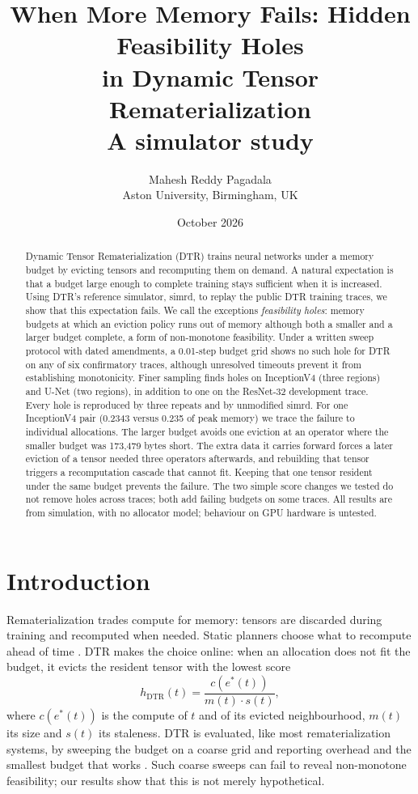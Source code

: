 \documentclass[11pt]{article}
\title{When More Memory Fails: Hidden Feasibility Holes\\in Dynamic Tensor Rematerialization\\[0.4em]
\large A simulator study}
\author{Mahesh Reddy Pagadala\\Aston University, Birmingham, UK}
\date{October 2026}
\begin{document}
\maketitle

\begin{abstract}
Dynamic Tensor Rematerialization (DTR) trains neural networks under a memory budget by
evicting tensors and recomputing them on demand. A natural expectation is that a budget
large enough to complete training stays sufficient when it is increased. Using DTR's
reference simulator, simrd, to replay the public DTR training traces, we show that this
expectation fails. We call the exceptions \emph{feasibility holes}: memory budgets at which
an eviction policy runs out of memory although both a smaller and a larger budget
complete, a form of non-monotone feasibility. Under a written sweep protocol with dated
amendments, a 0.01-step budget grid shows no such hole for DTR on any of six confirmatory
traces, although unresolved timeouts prevent it from establishing monotonicity. Finer sampling finds holes on InceptionV4 (three regions) and U-Net (two regions),
in addition to one on the ResNet-32 development trace. Every hole is reproduced by three
repeats and by unmodified simrd. For one InceptionV4 pair (0.2343 versus 0.235 of peak
memory) we trace the failure to individual allocations. The larger budget avoids one
eviction at an operator where the smaller budget was 173{,}479 bytes short. The extra data
it carries forward forces a later eviction of a tensor needed three operators afterwards,
and rebuilding that tensor triggers a recomputation cascade that cannot fit. Keeping that
one tensor resident under the same budget prevents the failure. The two simple score changes we
tested do not remove holes across traces; both add failing budgets on some traces. All results are from simulation,
with no allocator model; behaviour on GPU hardware is untested.
\end{abstract}

\section{Introduction}
Rematerialization trades compute for memory: tensors are discarded during training and
recomputed when needed. Static planners choose what to recompute ahead of time
\cite{chen2016,jain2020checkmate}. DTR \cite{kirisame2021dtr} makes the choice online: when
an allocation does not fit the budget, it evicts the resident tensor with the lowest score
\begin{equation}
h_{\mathrm{DTR}}(t) = \frac{c(e^*(t))}{m(t)\cdot s(t)},
\end{equation}
where $c(e^*(t))$ is the compute of $t$ and of its evicted neighbourhood, $m(t)$ its size
and $s(t)$ its staleness. DTR is evaluated, like most rematerialization systems, by sweeping
the budget on a coarse grid and reporting overhead and the smallest budget that works
\cite{kirisame2021dtr,zhang2023coop,wang2026tcontrol}. Such coarse sweeps can fail to
reveal non-monotone feasibility; our results show that this is not merely hypothetical.
\end{document}
